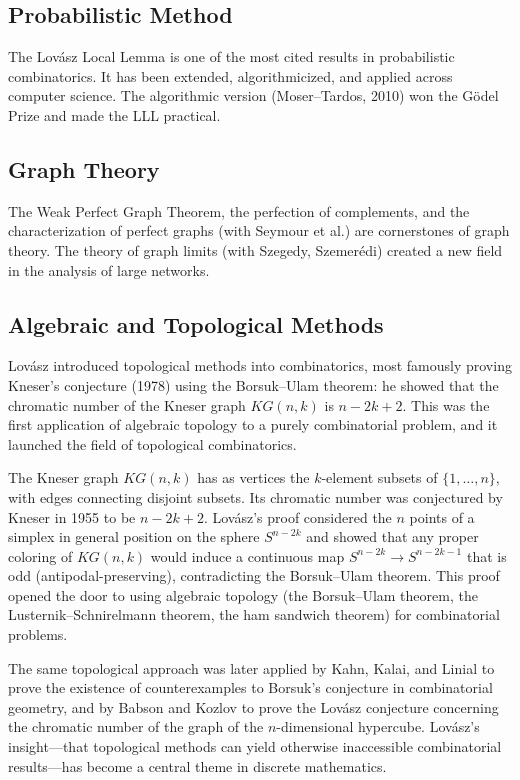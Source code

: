 \subsection{Probabilistic Method}
The Lov\'{a}sz Local Lemma is one of the most cited results in probabilistic combinatorics. It has been extended, algorithmicized, and applied across computer science. The algorithmic version (Moser--Tardos, 2010) won the G\"{o}del Prize and made the LLL practical.

\subsection{Graph Theory}
The Weak Perfect Graph Theorem, the perfection of complements, and the characterization of perfect graphs (with Seymour et al.) are cornerstones of graph theory. The theory of graph limits (with Szegedy, Szemer\'{e}di) created a new field in the analysis of large networks.

\subsection{Algebraic and Topological Methods}
Lov\'{a}sz introduced topological methods into combinatorics, most famously proving Kneser's conjecture (1978) using the Borsuk--Ulam theorem: he showed that the chromatic number of the Kneser graph \(KG(n,k)\) is \(n - 2k + 2\). This was the first application of algebraic topology to a purely combinatorial problem, and it launched the field of topological combinatorics.

The Kneser graph \(KG(n,k)\) has as vertices the \(k\)-element subsets of \(\{1,\dots,n\}\), with edges connecting disjoint subsets. Its chromatic number was conjectured by Kneser in 1955 to be \(n - 2k + 2\). Lov\'{a}sz's proof considered the \(n\) points of a simplex in general position on the sphere \(S^{n-2k}\) and showed that any proper coloring of \(KG(n,k)\) would induce a continuous map \(S^{n-2k} \to S^{n-2k-1}\) that is odd (antipodal-preserving), contradicting the Borsuk--Ulam theorem. This proof opened the door to using algebraic topology (the Borsuk--Ulam theorem, the Lusternik--Schnirelmann theorem, the ham sandwich theorem) for combinatorial problems.

The same topological approach was later applied by Kahn, Kalai, and Linial to prove the existence of counterexamples to Borsuk's conjecture in combinatorial geometry, and by Babson and Kozlov to prove the Lov\'{a}sz conjecture concerning the chromatic number of the graph of the \(n\)-dimensional hypercube. Lov\'{a}sz's insight---that topological methods can yield otherwise inaccessible combinatorial results---has become a central theme in discrete mathematics.

